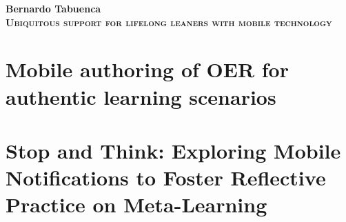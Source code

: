 \documentclass[a4paper,12pt,twoside,openright]{book}
\begin{document}
\nocite{*} %

\begin{titlepage}
	\null\vfill
	\center
		\Large
		\textbf{Bernardo Tabuenca}\\
		\vspace*{1em}
	\Huge
	\textbf{\textsc{Ubiquitous support for lifelong leaners with mobile technology}}\\
	\vfill\null
	
	\clearpage{\pagestyle{empty}\cleardoublepage}
\end{titlepage}
	
\frontmatter	
	\tableofcontents
	
	\cleardoublepage
	\listoffigures
	
	\cleardoublepage	
	\listoftables
	
	
	\clearpage{\pagestyle{empty}\cleardoublepage}
	\pagestyle{fancy}
	
\mainmatter
	
	
		\clearpage{\pagestyle{empty}\cleardoublepage}

%		
			
%		


	\part{Mobile authoring of OER for authentic learning scenarios}
		
			\clearpage{\pagestyle{empty}\cleardoublepage}	

	\part{Stop and Think: Exploring Mobile Notifications to Foster Reflective Practice on Meta-Learning}
		
			\clearpage{\pagestyle{empty}\cleardoublepage}				
						
\end{document}
